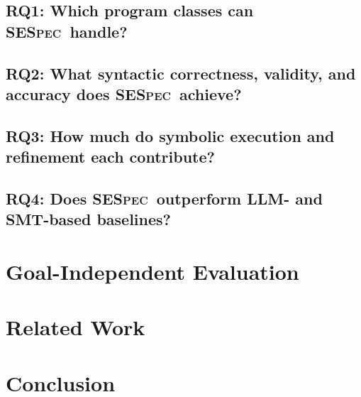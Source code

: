 \documentclass[lettersize,journal]{IEEEtran}
\newcommand{\toolname}{\textsc{SESpec}}
\begin{document}
\subsection{RQ1: Which program classes can \toolname\ handle?}



\subsection{RQ2: What syntactic correctness, validity, and accuracy does \toolname\ achieve?}



\subsection{RQ3: How much do symbolic execution and refinement each contribute?}




\subsection{RQ4: Does \toolname\ outperform LLM- and SMT-based baselines?}
\label{sec:inv_experiments}




\section{Goal-Independent Evaluation}



\section{Related Work}
\label{sec:relatedwork}




\section{Conclusion}
\label{sec:conclusion}

\end{document}
